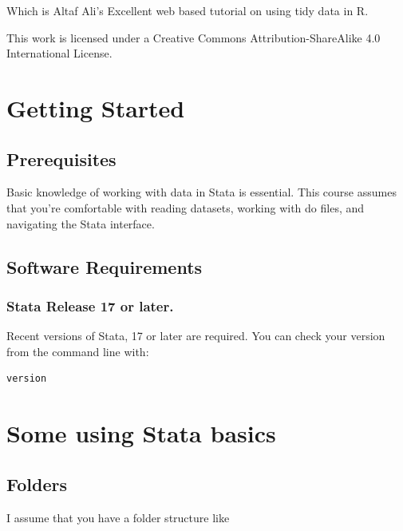 \documentclass[
]{article}
\begin{document}
Which is Altaf Ali's Excellent web based tutorial on using tidy data in R.

This work is licensed under a Creative Commons Attribution-ShareAlike 4.0 International License.

\hypertarget{getting-started}{%
\section{Getting Started}\label{getting-started}}

\hypertarget{prerequisites}{%
\subsection{Prerequisites}\label{prerequisites}}

Basic knowledge of working with data in Stata is essential. This course assumes that you're comfortable with reading datasets, working with do files, and navigating the Stata interface.

\hypertarget{software-requirements}{%
\subsection{Software Requirements}\label{software-requirements}}

\hypertarget{stata-release-17-or-later.}{%
\subsubsection{Stata Release 17 or later.}\label{stata-release-17-or-later.}}

Recent versions of Stata, 17 or later are required. You can check your version from the command line with:

\begin{verbatim}
version
\end{verbatim}

\hypertarget{some-using-stata-basics}{%
\section{Some using Stata basics}\label{some-using-stata-basics}}

\hypertarget{folders}{%
\subsection{Folders}\label{folders}}

I assume that you have a folder structure like
\end{document}
